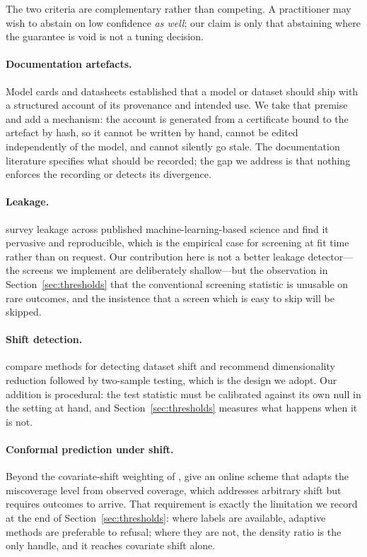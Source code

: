 \documentclass[11pt,a4paper]{article}
\theoremstyle{definition}
\begin{document}
The two criteria are complementary rather than competing. A practitioner may
wish to abstain on low confidence \emph{as well}; our claim is only that
abstaining where the guarantee is void is not a tuning decision.

\paragraph{Documentation artefacts.} Model cards \citep{mitchell2019} and
datasheets \citep{gebru2021} established that a model or dataset should ship
with a structured account of its provenance and intended use. We take that
premise and add a mechanism: the account is generated from a certificate bound
to the artefact by hash, so it cannot be written by hand, cannot be edited
independently of the model, and cannot silently go stale. The documentation
literature specifies what should be recorded; the gap we address is that
nothing enforces the recording or detects its divergence.

\paragraph{Leakage.} \citet{kapoor2023} survey leakage across published
machine-learning-based science and find it pervasive and reproducible, which
is the empirical case for screening at fit time rather than on request. Our
contribution here is not a better leakage detector---the screens we implement
are deliberately shallow---but the observation in Section~\ref{sec:thresholds} that the
conventional screening statistic is unusable on rare outcomes, and the
insistence that a screen which is easy to skip will be skipped.

\paragraph{Shift detection.} \citet{rabanser2019} compare methods for
detecting dataset shift and recommend dimensionality reduction followed by
two-sample testing, which is the design we adopt. Our addition is procedural:
the test statistic must be calibrated against its own null in the setting at
hand, and Section~\ref{sec:thresholds} measures what happens when it is not.

\paragraph{Conformal prediction under shift.} Beyond the covariate-shift
weighting of \citet{tibshirani2019}, \citet{gibbs2021} give an online scheme
that adapts the miscoverage level from observed coverage, which addresses
arbitrary shift but requires outcomes to arrive. That requirement is exactly
the limitation we record at the end of Section~\ref{sec:thresholds}: where labels
are available,
adaptive methods are preferable to refusal; where they are not, the density
ratio is the only handle, and it reaches covariate shift alone.
\end{document}
